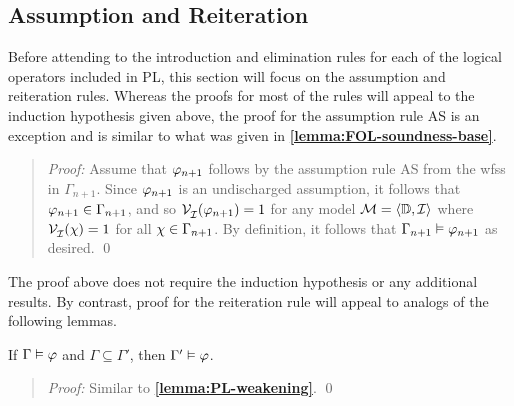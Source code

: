 \subsection{Assumption and Reiteration}%
  \label{sub:AssumptionRule}

Before attending to the introduction and elimination rules for each of the logical operators included in PL, this section will focus on the assumption and reiteration rules.
Whereas the proofs for most of the rules will appeal to the induction hypothesis given above, the proof for the assumption rule AS is an exception and is similar to what was given in \textbf{\ref{lemma:FOL-soundness-base}}. 


\begin{quote} 
  \textit{Proof:} Assume that $\varphi_{n+1}$ follows by the assumption rule AS from the wfss in $\Gamma_{n+1}$.
  Since $\varphi_{n+1}$ is an undischarged assumption, it follows that $\varphi_{n+1}\in\Gamma_{n+1}$, and so $\mathcal{V}_{\mathcal{I}}^{}(\varphi_{n+1}) = 1$ for any model $\mathcal{M} = \langle\mathbb{D}, \mathcal{I}\rangle$ where $\mathcal{V}_{\mathcal{I}}^{}(\chi) = 1$ for all $\chi \in \Gamma_{n+1}$. 
  By definition, it follows that $\Gamma_{n+1} \vDash \varphi_{n+1}$ as desired.
  \qed
\end{quote}

The proof above does not require the induction hypothesis or any additional results.
By contrast, proof for the reiteration rule will appeal to analogs of the following lemmas.

\begin{Lthm} \label{lemma:FOL-smweak}
  If $\Gamma \vDash \varphi$ and $\Gamma \subseteq \Gamma'$, then $\Gamma' \vDash \varphi$.
\end{Lthm}

\begin{quote} 
  \textit{Proof:}
  Similar to \textbf{\ref{lemma:PL-weakening}}.
  \qed
\end{quote}


